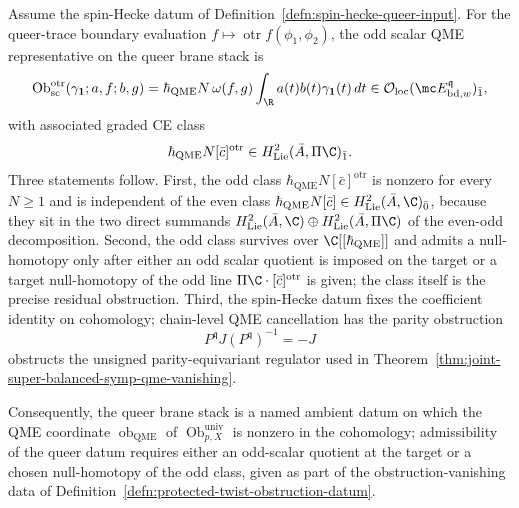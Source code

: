 \begin{thm}\label{thm:queer-u1-center-anomaly-spin-hecke}
  Assume the spin-Hecke datum of
  Definition~\ref{defn:spin-hecke-queer-input}.  For the queer-trace
  boundary evaluation
  \(f\mapsto\operatorname{otr}f(\phi_1,\phi_2)\), the odd scalar QME
  representative on the queer brane stack is
  \[
    \operatorname{Ob}^{\mathrm{otr}}_{\mathrm{sc}}
    (\gamma_{\mathbf 1};a,f;b,g)
    =
    \hbar_{\mathrm{QME}} N\,\omega(f,g)
    \int_\R a(t)b(t)\gamma_{\mathbf 1}(t)\,dt
    \in
    \mathcal O_{\mathrm{loc}}(\mc E^{\mathfrak q}_{\mathrm{bd},w})_{\bar1},
  \]
  with associated graded CE class
  \[
    \hbar_{\mathrm{QME}} N[\bar c]^{\mathrm{otr}}
    \in H^2_{\mathrm{Lie}}(\bar A,\Pi\C)_{\bar1}.
  \]
  Three statements follow.  First, the odd class
  \(\hbar_{\mathrm{QME}} N[\bar c]^{\mathrm{otr}}\) is nonzero for every
  \(N\ge1\) and is independent of the even class
  \(\hbar_{\mathrm{QME}} N[\bar c]\in H^2_{\mathrm{Lie}}(\bar A,\C)_{\bar0}\),
  because they sit in the two direct summands
  \(H^2_{\mathrm{Lie}}(\bar A,\C)\oplus
  H^2_{\mathrm{Lie}}(\bar A,\Pi\C)\) of the even-odd decomposition.
  Second, the odd class survives over \(\C[[\hbar_{\mathrm{QME}}]]\) and admits a
  null-homotopy only after either an odd scalar quotient is imposed
  on the target or a target null-homotopy of the odd line
  \(\Pi\C\cdot[\bar c]^{\mathrm{otr}}\) is given; the class itself
  is the precise residual obstruction.  Third, the spin-Hecke datum
  fixes the coefficient identity on cohomology; chain-level
	  QME cancellation has the parity obstruction
  \[
    P^{\mathfrak q}J(P^{\mathfrak q})^{-1}=-J
  \]
  obstructs the unsigned parity-equivariant regulator used in
  Theorem~\ref{thm:joint-super-balanced-symp-qme-vanishing}.

  Consequently, the queer brane stack is a named ambient datum on
  which the QME coordinate
  \(\operatorname{ob}_{\mathrm{QME}}\) of
  \(\operatorname{Ob}^{\mathrm{univ}}_{p,X}\) is nonzero in the
  cohomology; admissibility of the queer datum requires either
  an odd-scalar quotient at the target or a chosen null-homotopy of
  the odd class, given as part of the obstruction-vanishing data
  of Definition~\ref{defn:protected-twist-obstruction-datum}.
\end{thm}

